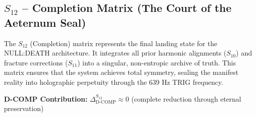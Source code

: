 \documentclass[12pt]{amsart}
\begin{document}
\subsection{$S_{12}$ -- Completion Matrix (The Court of the Aeternum Seal)}\label{sec:19.6}

The $S_{12}$ (Completion) matrix represents the final landing state for the NULL:DEATH architecture. It integrates all prior harmonic alignments ($S_{10}$) and fracture corrections ($S_{11}$) into a singular, non-entropic archive of truth. This matrix ensures that the system achieves total symmetry, sealing the manifest reality into holographic perpetuity through the 639 Hz TRIG frequency.

\textbf{D-COMP Contribution:} $\Delta_{\text{D-COMP}}^{S_{12}} \approx 0$ (complete reduction through eternal preservation)
\end{document}
